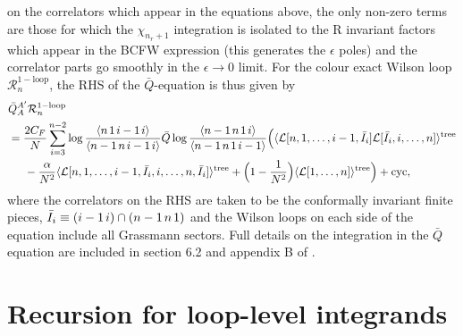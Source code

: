 \documentclass[12pt]{article}
\numberwithin{equation}{section}
\begin{document}
on the correlators which appear in the equations above, the only non-zero terms are those for which the $\chi_{n_r+1}$ integration is isolated to the R invariant factors which appear in the BCFW expression (this generates the $\epsilon$ poles) and the correlator parts go smoothly in the $\epsilon\rightarrow 0$ limit. For the colour exact Wilson loop $\mathcal{R}_{n}^{1-\textrm{loop}}$, the RHS of the $\bar{Q}$-equation is thus given by
\begin{align}
    &\bar{Q}_A^{A'}\mathcal{R}_n^{1-\textrm{loop}}\notag\\
    &=\frac{2 C_F}{N} \sum_{i=3}^{n-2} \log \frac{\langle n\hspace{0.5mm}1 \hspace{0.5mm} i-1 \hspace{0.5mm} i\rangle}{\langle n-1 \hspace{0.5mm} n \hspace{0.5mm} i-1 \hspace{0.5mm} i\rangle }\bar{Q}\log \frac{\langle n-1 \hspace{0.5mm} n \hspace{0.5mm} 1 \hspace{0.5mm} i \rangle}{\langle n-1 \hspace{0.5mm}n \hspace{0.5mm} 1 \hspace{0.5mm} i-1 \rangle} \Big(\langle \mathcal{L}[n,1,\hdots,i-1,\bar{I}_i]\mathcal{L}[\bar{I}_i,i,\hdots,n]\rangle^{\textrm{tree}}\notag \\
    &\hspace{5mm}-\frac{\alpha}{N^2}\langle \mathcal{L}[n,1,\hdots,i-1,\bar{I}_i,i,\hdots,n,\bar{I}_i]\rangle^{\textrm{tree}}+\Big(1-\frac{1}{N^2}\Big)\langle \mathcal{L}[1,\hdots,n]\rangle^{\textrm{tree}}\Big)+\textrm{cyc},
\end{align}
where the correlators on the RHS are taken to be the conformally invariant finite pieces, $\bar{I}_i\equiv(i-1\hspace{0.5mm} i)\cap (n-1\hspace{0.5mm} n\hspace{0.5mm} 1)$ and the Wilson loops on each side of the equation include all Grassmann sectors. Full details on the integration in the $\bar{Q}$ equation are included in section 6.2 and appendix B of \cite{Drummond:2026lvq}. 

\section{Recursion for loop-level integrands}
\end{document}
